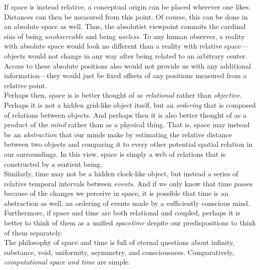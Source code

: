 If space is instead relative, a conceptual origin can be placed wherever one likes. Distances can then be measured from this point. Of course, this can be done in an absolute space as well. Thus, the absolutist viewpoint commits the cardinal sins of being \textit{unobservable} and being \textit{useless}. To any human observer, a reality with absolute space would look no different than a reality with relative space---objects would not change in any way after being related to an arbitrary center. Access to these absolute positions also would not provide us with any additional information---they would just be fixed offsets of any positions measured from a relative point. \\

Perhaps then, space is is better thought of as \textit{relational} rather than \textit{objective}. Perhaps it is not a hidden grid-like object itself, but an \textit{ordering} that is composed of relations between objects. And perhaps then it is also better thought of as a product of the \textit{mind} rather than as a physical thing. That is, space may instead be an \textit{abstraction} that our minds make by estimating the relative distance between two objects and comparing it to every other potential spatial relation in our surroundings. In this view, space is simply a web of relations that is constructed by a sentient being. \\

Similarly, time may not be a hidden clock-like object, but instead a series of relative temporal intervals between \textit{events}. And if we only know that time passes because of the changes we perceive in space, it is possible that time is an abstraction as well, an ordering of events made by a sufficiently conscious mind. Furthermore, if space and time are both relational and coupled, perhaps it is better to think of them as a unified \textit{spacetime} despite our predispositions to think of them separately. \\

The philosophy of space and time is full of eternal questions about infinity, substance, void, uniformity, asymmetry, and consciousness. Comparatively, \textit{computational space and time} are simple. \\




